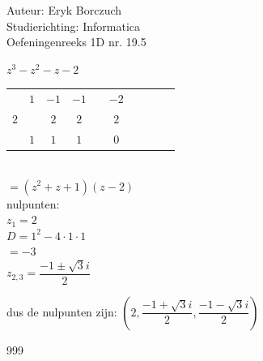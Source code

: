\documentclass[a4paper]{article}
\begin{document}
  
\noindent \large Auteur: Eryk Borczuch \\
\noindent \large Studierichting: Informatica\\
\noindent \large Oefeningenreeks 1D nr. 19.5\\

\medskip

\normalsize

$z^3 - z^2 - z -2$\\

\begin{tabular}{c|ccccccccc}
& $1$ & $-1$ & $-1$   & \vline & $-2$ \\
$2$ & & $2$ & $2$ & \vline & $2$ \\ \hline
& $1$ & $1$ & $1$ &    \vline & $0$ \\
\end{tabular}\\

$= (z^2+z+1)(z-2)$\\

nulpunten: \\

$z_1 = 2$\\

$D = 1^2 -4\cdot1\cdot1$\\

$= -3$\\

$z_{2,3} = \dfrac{-1 \pm \sqrt{3}i}{2}$

dus de nulpunten zijn: $\left(2, \dfrac{-1 + \sqrt{3}i}{2}, \dfrac{-1 - \sqrt{3}i}{2}\right)$
\begin{thebibliography}{999}
\end{thebibliography}
\end{document}
